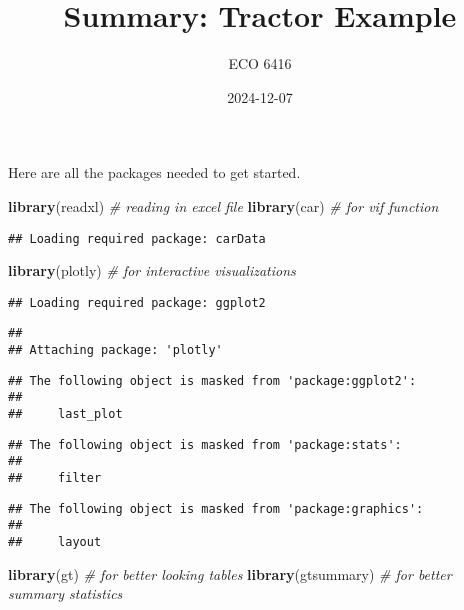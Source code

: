 \documentclass[
]{article}
\title{Summary: Tractor Example}
\author{ECO 6416}
\date{2024-12-07}
\newenvironment{Shaded}{\begin{snugshade}}{\end{snugshade}}
\newcommand{\CommentTok}[1]{\textcolor[rgb]{0.56,0.35,0.01}{\textit{#1}}}
\newcommand{\FunctionTok}[1]{\textcolor[rgb]{0.13,0.29,0.53}{\textbf{#1}}}
\newcommand{\NormalTok}[1]{#1}
\begin{document}
\maketitle

{
\setcounter{tocdepth}{2}
\tableofcontents
}
Here are all the packages needed to get started.

\begin{Shaded}
\begin{Highlighting}[]
\FunctionTok{library}\NormalTok{(readxl) }\CommentTok{\# reading in excel file}
\FunctionTok{library}\NormalTok{(car) }\CommentTok{\# for vif function}
\end{Highlighting}
\end{Shaded}

\begin{verbatim}
## Loading required package: carData
\end{verbatim}

\begin{Shaded}
\begin{Highlighting}[]
\FunctionTok{library}\NormalTok{(plotly) }\CommentTok{\# for interactive visualizations}
\end{Highlighting}
\end{Shaded}

\begin{verbatim}
## Loading required package: ggplot2
\end{verbatim}

\begin{verbatim}
## 
## Attaching package: 'plotly'
\end{verbatim}

\begin{verbatim}
## The following object is masked from 'package:ggplot2':
## 
##     last_plot
\end{verbatim}

\begin{verbatim}
## The following object is masked from 'package:stats':
## 
##     filter
\end{verbatim}

\begin{verbatim}
## The following object is masked from 'package:graphics':
## 
##     layout
\end{verbatim}

\begin{Shaded}
\begin{Highlighting}[]
\FunctionTok{library}\NormalTok{(gt) }\CommentTok{\# for better looking tables}
\FunctionTok{library}\NormalTok{(gtsummary) }\CommentTok{\# for better summary statistics}
\end{Highlighting}
\end{Shaded}
\end{document}
